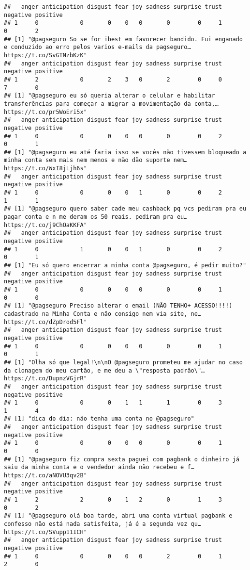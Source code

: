 \documentclass[
]{article}
\begin{document}
\begin{verbatim}
##   anger anticipation disgust fear joy sadness surprise trust negative positive
## 1     0            0       0    0   0       0        0     1        0        2
## [1] "@pagseguro So se for ibest em favorecer bandido. Fui enganado e conduzido ao erro pelos varios e-mails da pagseguro… https://t.co/SvGTNzbKzK"
##   anger anticipation disgust fear joy sadness surprise trust negative positive
## 1     2            0       2    3   0       2        0     0        7        0
## [1] "@pagseguro eu só queria alterar o celular e habilitar transferências para começar a migrar a movimentação da conta,… https://t.co/pr5WoEri5x"
##   anger anticipation disgust fear joy sadness surprise trust negative positive
## 1     0            0       0    0   0       0        0     2        0        1
## [1] "@pagseguro eu até faria isso se vocês não tivessem bloqueado a minha conta sem mais nem menos e não dão suporte nem… https://t.co/WxI8jLjh6s"
##   anger anticipation disgust fear joy sadness surprise trust negative positive
## 1     0            0       0    0   1       0        0     2        1        1
## [1] "@pagseguro quero saber cade meu cashback pq vcs pediram pra eu pagar conta e n me deram os 50 reais. pediram pra eu… https://t.co/j9ChOaKKFA"
##   anger anticipation disgust fear joy sadness surprise trust negative positive
## 1     0            1       0    0   1       0        0     2        0        1
## [1] "Eu só quero encerrar a minha conta @pagseguro, é pedir muito?"
##   anger anticipation disgust fear joy sadness surprise trust negative positive
## 1     0            0       0    0   0       0        0     1        0        0
## [1] "@pagseguro Preciso alterar o email (NÃO TENHO+ ACESSO!!!!) cadastrado na Minha Conta e não consigo nem via site, ne… https://t.co/dZpDrod5Fl"
##   anger anticipation disgust fear joy sadness surprise trust negative positive
## 1     0            0       0    0   0       0        0     1        0        1
## [1] "Olha só que legal!\n\nO @pagseguro prometeu me ajudar no caso da clonagem do meu cartão, e me deu a \"resposta padrão\"… https://t.co/DupnzVGjrR"
##   anger anticipation disgust fear joy sadness surprise trust negative positive
## 1     0            0       0    1   1       1        0     3        1        4
## [1] "dica do dia: não tenha uma conta no @pagseguro"
##   anger anticipation disgust fear joy sadness surprise trust negative positive
## 1     0            0       0    0   0       0        0     1        0        0
## [1] "@pagseguro fiz compra sexta paguei com pagbank o dinheiro já saiu da minha conta e o vendedor ainda não recebeu e f… https://t.co/aNOVU3qv2B"
##   anger anticipation disgust fear joy sadness surprise trust negative positive
## 1     2            2       0    1   2       0        1     3        0        2
## [1] "@pagseguro olá boa tarde, abri uma conta virtual pagbank e confesso não está nada satisfeita, já é a segunda vez qu… https://t.co/SVupp11ICH"
##   anger anticipation disgust fear joy sadness surprise trust negative positive
## 1     0            0       0    0   0       2        0     1        2        0
\end{verbatim}
\end{document}
